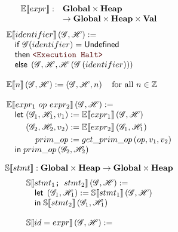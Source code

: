 \begin{figure}

\begin{minipage}{.46\textwidth}
\[\begin{array}{rl}
  \mathbb{E}\!\left\llbracket expr \right\rrbracket :& \mathbf{Global} \times \mathbf{Heap} \\
  &\to \mathbf{Global} \times \mathbf{Heap} \times \mathbf{Val} \\
\end{array}\]
\[
  \begin{array}{l}
    \Ctx{E}{identifier}\left(\Glo, \Hea\right) := \\
    \quad \ifm \Glo(identifier) = \undefm \\
    \quad \thenm \Halt \\
    \quad \elsem \left(\Glo, \Hea, \Hea\left(\Glo\left(identifier\right)\right)\right) \\
    \\
    \Ctx{E}{n}\left(\Glo, \Hea\right) := \left(\Glo, \Hea, n\right) \quad \text{for all } n \in \mathbb{Z}\\
    \\
    \Ctx{E}{expr_1~op~expr_2}\left(\Glo, \Hea\right) := \\
    \quad \letm
    \begin{aligned}[t]
       \left(\Glo_1, \Hea_1, v_1\right) &:= \Ctx{E}{expr_1}\left(\Glo, \Hea\right) \\
       \left(\Glo_2, \Hea_2, v_2\right) &:= \Ctx{E}{expr_2}\left(\Glo_1, \Hea_1\right) \\
       prim\_op &:= get\_prim\_op\left(op, v_1, v_2\right) \\
    \end{aligned} \\
    \quad \inm prim\_op\left(\Glo_2, \Hea_2\right)
  \end{array}
\]
\end{minipage}%
\hfill%
\begin{minipage}{.46\textwidth}
\[\mathbb{S}\!\left\llbracket stmt \right\rrbracket : \mathbf{Global} \times \mathbf{Heap} \to \mathbf{Global} \times \mathbf{Heap}\]
\[
  \begin{array}{l}
    \mathbb{S}\!\left\llbracket stmt_1\texttt{; } stmt_2 \right\rrbracket\left(\mathscr{G}, \mathscr{H}\right) := \\
    \quad \mathsf{let}\; \left(\mathscr{G}_1, \mathscr{H}_1\right) := \mathbb{S}\!\left\llbracket stmt_1 \right\rrbracket\left(\mathscr{G}, \mathscr{H}\right) \\
    \quad \mathsf{in}\; \mathbb{S}\!\left\llbracket stmt_2 \right\rrbracket\left(\mathscr{G}_1, \mathscr{H}_1\right) \\
    \\
    \mathbb{S}\!\left\llbracket id = expr \right\rrbracket\left(\mathscr{G}, \mathscr{H}\right) := \\

\end{array}\]
\end{minipage}
\end{figure}
